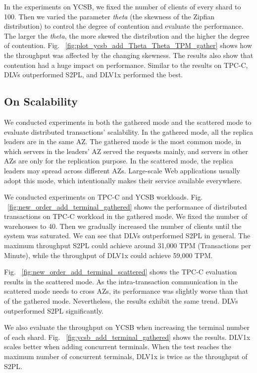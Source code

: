 \documentclass[conference]{IEEEtran}
\begin{document}
In the experiments on YCSB, we fixed the number of clients of every shard to 100.
Then we varied the parameter \emph{theta} (the skewness of the Zipfian distribution) to control the degree of contention and evaluate the performance.
The larger the \emph{theta}, the more skewed the distribution and the higher the degree of contention.
Fig. ~\ref{fig:plot_ycsb_add_Theta_Theta_TPM_gather} shows how the throughput was affected by the changing skewness.
The results also show that contention had a huge impact on performance.
Similar to the results on TPC-C, DLVs outperformed S2PL, and DLV1x performed the best.

\subsection{On Scalability}

We conducted experiments in both the gathered mode and the scattered mode to evaluate distributed transactions' scalability.
In the gathered mode, all the replica leaders are in the same AZ.
The gathered mode is the most common mode, in which servers in the leaders' AZ served the requests mainly, and servers in other AZs are only for the replication purpose.
In the scattered mode, the replica leaders may spread across different AZs.
Large-scale Web applications usually adopt this mode, which intentionally makes their service available everywhere.

We conducted experiments on TPC-C and YCSB workloads.
Fig. ~\ref{fig:new_order_add_terminal_gathered} shows the performance of distributed transactions on TPC-C workload in the gathered mode.
We fixed the number of warehouses to 40.
Then we gradually increased the number of clients until the system was saturated.
We can see that DLVs outperformed S2PL in general.
The maximum throughput S2PL could achieve around 31,000 TPM (Transactions per Minute),
while the throughput of DLV1x could achieve 59,000 TPM.


Fig. ~\ref{fig:new_order_add_terminal_scattered}  shows the TPC-C evaluation results in the scattered mode.
As the intra-transaction communication in the scattered mode needs to cross AZs, its performance was slightly worse than that of the gathered mode.
Nevertheless, the results exhibit the same trend. DLVs outperformed S2PL significantly.

We also evaluate the throughput on YCSB when increasing the terminal number of each shard.
Fig. ~\ref{fig:ycsb_add_terminal_gathered} shows the results.
DLV1x scales better when adding concurrent terminals.
When the test reaches the maximum number of concurrent terminals, DLV1x is twice as the throughput of S2PL.
\end{document}

